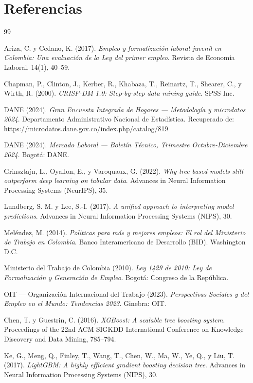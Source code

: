 \documentclass[12pt, a4paper]{article}
\begin{document}
\section{Referencias}
\label{sec:referencias}

\begin{thebibliography}{99}

Ariza, C. y Cedano, K. (2017).
\textit{Empleo y formalización laboral juvenil en Colombia: Una evaluación de la
Ley del primer empleo}.
Revista de Economía Laboral, 14(1), 40--59.

Chapman, P., Clinton, J., Kerber, R., Khabaza, T., Reinartz, T., Shearer, C., y Wirth, R. (2000).
\textit{CRISP-DM 1.0: Step-by-step data mining guide}.
SPSS Inc.

DANE (2024).
\textit{Gran Encuesta Integrada de Hogares — Metodología y microdatos 2024}.
Departamento Administrativo Nacional de Estadística. Recuperado de:
\url{https://microdatos.dane.gov.co/index.php/catalog/819}

DANE (2024).
\textit{Mercado Laboral — Boletín Técnico, Trimestre Octubre-Diciembre 2024}.
Bogotá: DANE.

Grinsztajn, L., Oyallon, E., y Varoquaux, G. (2022).
\textit{Why tree-based models still outperform deep learning on tabular data}.
Advances in Neural Information Processing Systems (NeurIPS), 35.

Lundberg, S. M. y Lee, S.-I. (2017).
\textit{A unified approach to interpreting model predictions}.
Advances in Neural Information Processing Systems (NIPS), 30.

Meléndez, M. (2014).
\textit{Políticas para más y mejores empleos: El rol del Ministerio de Trabajo en Colombia}.
Banco Interamericano de Desarrollo (BID). Washington D.C.

Ministerio del Trabajo de Colombia (2010).
\textit{Ley 1429 de 2010: Ley de Formalización y Generación de Empleo}.
Bogotá: Congreso de la República.

OIT — Organización Internacional del Trabajo (2023).
\textit{Perspectivas Sociales y del Empleo en el Mundo: Tendencias 2023}.
Ginebra: OIT.

Chen, T. y Guestrin, C. (2016).
\textit{XGBoost: A scalable tree boosting system}.
Proceedings of the 22nd ACM SIGKDD International Conference on Knowledge Discovery
and Data Mining, 785--794.

Ke, G., Meng, Q., Finley, T., Wang, T., Chen, W., Ma, W., Ye, Q., y Liu, T. (2017).
\textit{LightGBM: A highly efficient gradient boosting decision tree}.
Advances in Neural Information Processing Systems (NIPS), 30.

\end{thebibliography}
\end{document}
